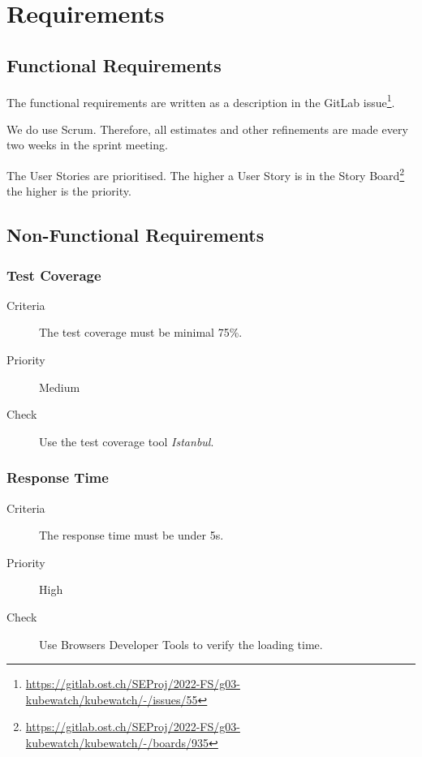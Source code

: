 \chapter{Requirements}



\section{Functional Requirements}
The functional requirements are written as a description in the GitLab issue\footnote{\url{https://gitlab.ost.ch/SEProj/2022-FS/g03-kubewatch/kubewatch/-/issues/55}}.

We do use Scrum.
Therefore, all estimates and other refinements are made every two weeks in the sprint meeting.

The User Stories are prioritised.
The higher a User Story is in the Story Board\footnote{\url{https://gitlab.ost.ch/SEProj/2022-FS/g03-kubewatch/kubewatch/-/boards/935}} the higher is the priority.



\section{Non-Functional Requirements}
\subsection{Test Coverage}
\begin{description}
\item[Criteria] The test coverage must be minimal 75\%.
\item[Priority] Medium
\item[Check] Use the test coverage tool \textsl{Istanbul}.
\end{description}

\subsection{Response Time}
\begin{description}
\item[Criteria] The response time must be under 5s.
\item[Priority] High
\item[Check] Use Browsers Developer Tools to verify the loading time.
\end{description}

